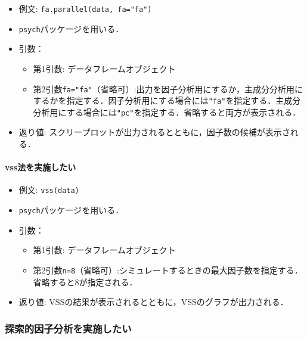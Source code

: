 \documentclass[
  xelatex, ja=standard]{bxjsarticle}
\providecommand{\tightlist}{%
  \setlength{\itemsep}{0pt}\setlength{\parskip}{0pt}}
\begin{document}
\begin{itemize}
\tightlist
\item
  例文: \texttt{fa.parallel(data,\ fa="fa")}
\item
  \texttt{psych}パッケージを用いる．
\item
  引数：

  \begin{itemize}
  \tightlist
  \item
    第1引数: データフレームオブジェクト
  \item
    第2引数\texttt{fa="fa"}（省略可）:出力を因子分析用にするか，主成分分析用にするかを指定する．因子分析用にする場合には\texttt{"fa"}を指定する．主成分分析用にする場合には\texttt{"pc"}を指定する．省略すると両方が表示される．
  \end{itemize}
\item
  返り値:
  スクリープロットが出力されるとともに，因子数の候補が表示される．
\end{itemize}

\paragraph{vss法を実施したい}\label{vssux6cd5ux3092ux5b9fux65bdux3057ux305fux3044}

\begin{itemize}
\tightlist
\item
  例文: \texttt{vss(data)}
\item
  \texttt{psych}パッケージを用いる．
\item
  引数：

  \begin{itemize}
  \tightlist
  \item
    第1引数: データフレームオブジェクト
  \item
    第2引数\texttt{n=8}（省略可）:シミュレートするときの最大因子数を指定する．省略すると8が指定される．
  \end{itemize}
\item
  返り値: VSSの結果が表示されるとともに，VSSのグラフが出力される．
\end{itemize}

\subsubsection{探索的因子分析を実施したい}\label{ux63a2ux7d22ux7684ux56e0ux5b50ux5206ux6790ux3092ux5b9fux65bdux3057ux305fux3044}
\end{document}
